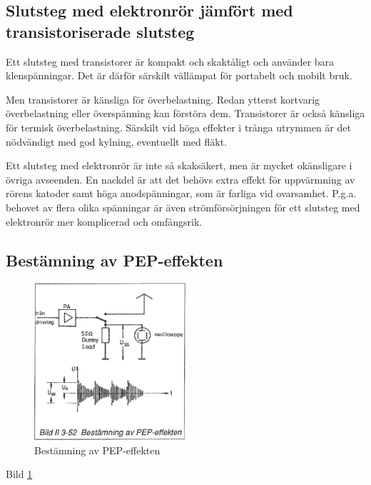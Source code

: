 \begin{rev-raderas}
\subsection{Slutsteg med elektronrör jämfört med transistoriserade slutsteg}

Ett slutsteg med transistorer är kompakt och skaktåligt och använder
bara klenspänningar. Det är därför särskilt vällämpat för portabelt
och mobilt bruk.

Men transistorer är känsliga för överbelastning. Redan ytterst
kortvarig överbelastning eller överspänning kan förstöra dem.
Transistorer är också känsliga för termisk överbelastning. Särskilt
vid höga effekter i trånga utrymmen är det nödvändigt med god kylning,
eventuellt med fläkt.

Ett slutsteg med elektronrör är inte så skaksäkert, men är mycket
okänsligare i övriga avseenden. En nackdel är att det behövs extra
effekt för uppvärmning av rörens katoder samt höga anodspänningar, som
är farliga vid ovarsamhet. P.g.a. behovet av flera olika spänningar är
även strömförsörjningen för ett slutsteg med elektronrör mer
komplicerad och omfångsrik.
\end{rev-raderas}

\subsection{Bestämning av PEP-effekten}

\begin{figure}
\includegraphics[width=0.5\textwidth]{images/bild_2_3-52}
\caption{Bestämning av PEP-effekten}
\label{fig:BildII3-52}
\end{figure}

Bild \ref{fig:BildII3-52}

